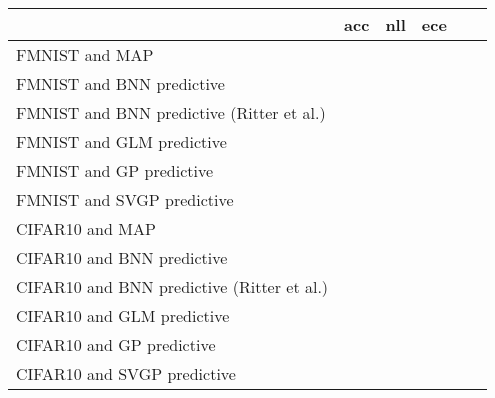 \begin{tabular}{l C{0.6\tblw} C{0.6\tblw} C{0.6\tblw} C{0.6\tblw} C{0.6\tblw}}
\toprule
& acc & nll & ece  \\
\midrule
\sc FMNIST and MAP &  &  &  \\
\sc FMNIST and BNN predictive &  &  &  \\
\sc FMNIST and BNN predictive (Ritter et al.) &  &  &  \\
\sc FMNIST and GLM predictive &  &  &  \\
\sc FMNIST and GP predictive &  &  &  \\
\sc FMNIST and SVGP predictive &  &  &  \\
\sc CIFAR10 and MAP &  &  &  \\
\sc CIFAR10 and BNN predictive &  &  &  \\
\sc CIFAR10 and BNN predictive (Ritter et al.) &  &  &  \\
\sc CIFAR10 and GLM predictive &  &  &  \\
\sc CIFAR10 and GP predictive &  &  &  \\
\sc CIFAR10 and SVGP predictive &  &  &  \\
\bottomrule
\end{tabular}
